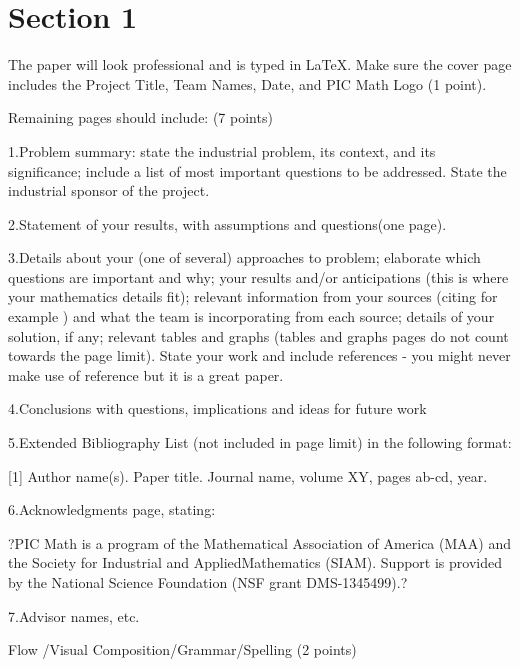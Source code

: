 \documentclass[12pt]{report}
\begin{document}

\tableofcontents
\pagebreak

\renewcommand{\thesection}{\arabic{section}}
\section{Section 1}
 

The paper will look professional and is typed in LaTeX. Make sure the cover page       includes the Project Title, Team Names, Date, and PIC Math Logo (1 point).

Remaining pages should include: (7 points) 

1.Problem summary: state the industrial problem, its context, and its significance; include a list of most important questions to be addressed. State the industrial sponsor of the project. 

2.Statement of your results, with assumptions and questions(one page).

3.Details about your (one of several) approaches to problem; elaborate which questions are important and why; your results and/or anticipations (this is where your mathematics details fit); relevant information from your sources (citing for example \cite{ACAMP}) and what the team is incorporating from each source; details of your solution, if any; relevant tables and graphs (tables and graphs pages do not count towards the page limit). State your work and include references - you might never make use of reference \cite{ACMT} but it is a great paper.

4.Conclusions with questions, implications and ideas for future work

5.Extended Bibliography List (not included in page limit) in the following format: 

[1] Author name(s). Paper title. Journal name, volume XY, pages ab-cd, year. 

6.Acknowledgments page, stating:

?PIC Math is a program of the Mathematical Association of America (MAA) and the Society for Industrial and AppliedMathematics (SIAM). Support is provided by the National Science Foundation (NSF grant DMS-1345499).?

7.Advisor names, etc. 

Flow /Visual Composition/Grammar/Spelling (2 points) 
\end{document}
